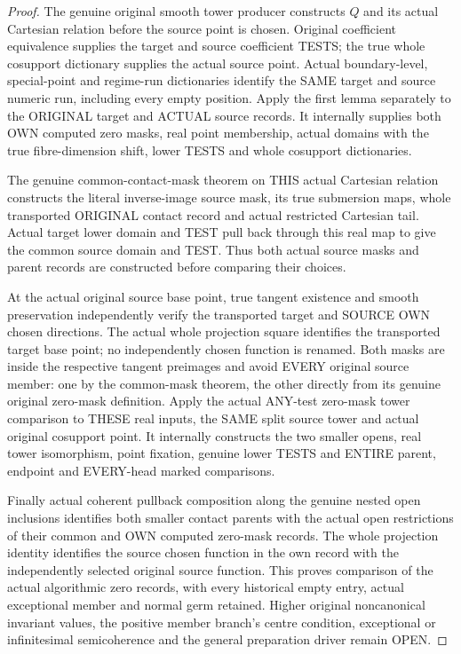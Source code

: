 \begin{proof}
The genuine original smooth tower producer constructs $Q$ and its actual
Cartesian relation before the source point is chosen. Original coefficient
equivalence supplies the target and source coefficient TESTS; the true
whole cosupport dictionary supplies the actual source point. Actual
boundary-level, special-point and regime-run dictionaries identify the
SAME target and source numeric run, including every empty position.
Apply the first lemma separately to the ORIGINAL target and ACTUAL source
records. It internally supplies both OWN computed zero masks, real point
membership, actual domains with the true fibre-dimension shift, lower
TESTS and whole cosupport dictionaries.

The genuine common-contact-mask theorem on THIS actual Cartesian relation
constructs the literal inverse-image source mask, its true submersion maps,
whole transported ORIGINAL contact record and actual restricted Cartesian
tail. Actual target lower domain and TEST pull back through this real map
to give the common source domain and TEST. Thus both actual source masks
and parent records are constructed before comparing their choices.

At the actual original source base point, true tangent existence and smooth
preservation independently verify the transported target and SOURCE OWN
chosen directions. The actual whole projection square identifies the
transported target base point; no independently chosen function is renamed.
Both masks are inside the respective tangent preimages and avoid EVERY
original source member: one by the common-mask theorem, the other directly
from its genuine original zero-mask definition. Apply the actual ANY-test
zero-mask tower comparison to THESE real inputs, the SAME split source
tower and actual original cosupport point. It internally constructs the
two smaller opens, real tower isomorphism, point fixation, genuine lower
TESTS and ENTIRE parent, endpoint and EVERY-head marked comparisons.

Finally actual coherent pullback composition along the genuine nested
open inclusions identifies both smaller contact parents with the actual
open restrictions of their common and OWN computed zero-mask records.
The whole projection identity identifies the source chosen function in
the own record with the independently selected original source function.
This proves comparison of the actual algorithmic zero records, with every
historical empty entry, actual exceptional member and normal germ retained.
Higher original noncanonical invariant values, the positive member branch's
centre condition, exceptional or infinitesimal semicoherence and the
general preparation driver remain OPEN.
\end{proof}
